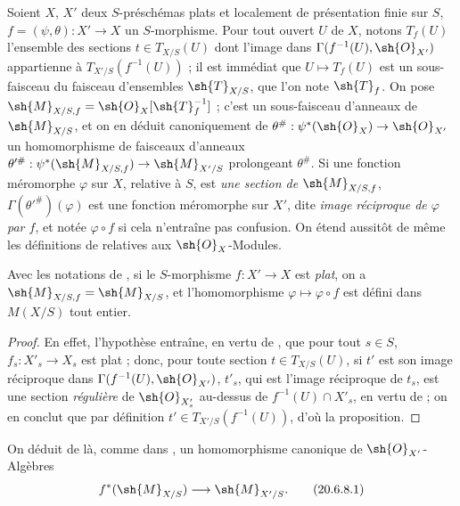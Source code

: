 \begin{env}[20.6.7]
\label{IV.20.6.7}
Soient $X$, $X'$ deux $S$-préschémas plats et localement de présentation finie sur $S$, $f=(\psi,\theta):X'\to X$ un $S$-morphisme.
Pour tout ouvert $U$ de $X$, notons $T_f(U)$ l'ensemble des sections $t\in T_{X/S}(U)$ dont l'image dans $\Gamma(f^{-1}(U),\sh{O}_{X'})$ appartienne à $T_{X'/S}(f^{-1}(U))$ ; il est immédiat que $U\mapsto T_f(U)$ est un sous-faisceau du faisceau d'ensembles $\sh{T}_{X/S}$, que l'on note $\sh{T}_f$.
On pose $\sh{M}_{X/S,f}=\sh{O}_X[\sh{T}_f^{-1}]$ ; c'est un sous-faisceau d'anneaux de $\sh{M}_{X/S}$, et on en déduit canoniquement de $\theta^\#: \psi^*(\sh{O}_X)\to\sh{O}_{X'}$ un homomorphisme de faisceaux d'anneaux $\theta'^\#: \psi^*(\sh{M}_{X/S,f})\to\sh{M}_{X'/S}$ prolongeant $\theta^\#$.
Si une fonction méromorphe $\varphi$ sur $X$, relative à $S$, est \emph{une section de $\sh{M}_{X/S,f}$}, $\Gamma(\theta'^\#)(\varphi)$ est une fonction méromorphe sur $X'$, dite \emph{image réciproque de $\varphi$ par $f$}, et notée $\varphi\circ f$ si cela n'entraîne pas confusion.
On étend aussitôt de même les définitions de  relatives aux $\sh{O}_X$-Modules.
\end{env}

\begin{proposition}[20.6.8]
\label{IV.20.6.8}
Avec les notations de , si le $S$-morphisme $f:X'\to X$ est \emph{plat}, on a $\sh{M}_{X/S,f}=\sh{M}_{X/S}$, et l'homomorphisme $\varphi\mapsto\varphi\circ f$ est défini dans $M(X/S)$ tout entier.
\end{proposition}

\begin{proof}
En effet, l'hypothèse entraîne, en vertu de , que pour tout $s\in S$, $f_s:X'_s\to X_s$ est plat ; donc, pour toute section $t\in T_{X/S}(U)$, si $t'$ est son image réciproque dans $\Gamma(f^{-1}(U),\sh{O}_{X'})$, $t'_{s}$, qui est l'image réciproque de $t_s$, est une section \emph{régulière} de $\sh{O}_{X'_s}$ au-dessus de $f^{-1}(U)\cap X'_s$, en vertu de  ; on en conclut que par définition $t'\in T_{X'/S}(f^{-1}(U))$, d'où la proposition.
\end{proof}

On déduit de là, comme dans , un homomorphisme canonique de $\sh{O}_{X'}$-Algèbres
\[
\label{IV.20.6.8.1}
  f^*(\sh{M}_{X/S})\to\sh{M}_{X'/S}.
  \tag{20.6.8.1}
\]

